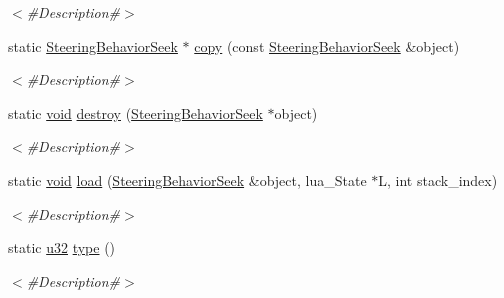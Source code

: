 \begin{DoxyCompactItemize}
\begin{DoxyCompactList}\small\item\em $<$\#\+Description\#$>$ \end{DoxyCompactList}\item 
static \mbox{\hyperlink{classnjli_1_1_steering_behavior_seek}{Steering\+Behavior\+Seek}} $\ast$ \mbox{\hyperlink{classnjli_1_1_steering_behavior_seek_a3cde3f5461f45f3576059a1ed679ff9e}{copy}} (const \mbox{\hyperlink{classnjli_1_1_steering_behavior_seek}{Steering\+Behavior\+Seek}} \&object)
\begin{DoxyCompactList}\small\item\em $<$\#\+Description\#$>$ \end{DoxyCompactList}\item 
static \mbox{\hyperlink{_thread_8h_af1e856da2e658414cb2456cb6f7ebc66}{void}} \mbox{\hyperlink{classnjli_1_1_steering_behavior_seek_a16ed9e922ca030f1c3bd27c04133cf8f}{destroy}} (\mbox{\hyperlink{classnjli_1_1_steering_behavior_seek}{Steering\+Behavior\+Seek}} $\ast$object)
\begin{DoxyCompactList}\small\item\em $<$\#\+Description\#$>$ \end{DoxyCompactList}\item 
static \mbox{\hyperlink{_thread_8h_af1e856da2e658414cb2456cb6f7ebc66}{void}} \mbox{\hyperlink{classnjli_1_1_steering_behavior_seek_a5a32ccc98ee9030ea757ea01b85385a0}{load}} (\mbox{\hyperlink{classnjli_1_1_steering_behavior_seek}{Steering\+Behavior\+Seek}} \&object, lua\+\_\+\+State $\ast$L, int stack\+\_\+index)
\begin{DoxyCompactList}\small\item\em $<$\#\+Description\#$>$ \end{DoxyCompactList}\item 
static \mbox{\hyperlink{_util_8h_a10e94b422ef0c20dcdec20d31a1f5049}{u32}} \mbox{\hyperlink{classnjli_1_1_steering_behavior_seek_a4182ef705cad2a292e63e87223b8a036}{type}} ()
\begin{DoxyCompactList}\small\item\em $<$\#\+Description\#$>$ \end{DoxyCompactList}\end{DoxyCompactItemize}
